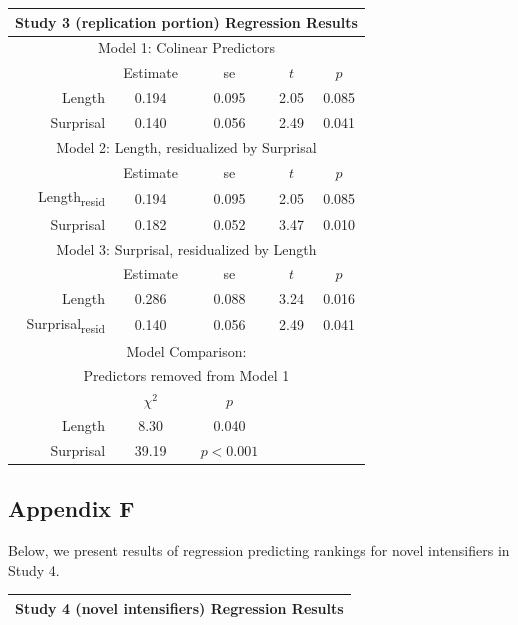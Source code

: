 \noindent
\footnotesize{
\begin{tabular}{r|cccc}
\hline
\hline
\multicolumn{5}{c}{\textbf{Study 3 (replication portion) Regression Results}} \\
\hline
\hline
\multicolumn{5}{c}{Model 1: Colinear Predictors} \\
& Estimate & se & $t$ & $p$ \\
\hline
Length & 0.194 & 0.095 & 2.05 & 0.085 \\
Surprisal & 0.140 & 0.056 & 2.49 & 0.041 \\
\hline
\hline
\multicolumn{5}{c}{Model 2: Length, residualized by Surprisal} \\
& Estimate & se & $t$ & $p$ \\
\hline
Length\textsubscript{resid} & 0.194 & 0.095 & 2.05 & 0.085 \\
Surprisal & 0.182 & 0.052 & 3.47 & 0.010 \\
\hline
\hline
\multicolumn{5}{c}{Model 3: Surprisal, residualized by Length} \\
& Estimate & se & $t$ & $p$ \\
\hline
Length & 0.286 & 0.088 & 3.24 & 0.016 \\
Surprisal\textsubscript{resid} & 0.140 & 0.056 & 2.49 & 0.041 \\
\hline
\hline
\multicolumn{5}{c}{Model Comparison:} \\
\multicolumn{5}{c}{Predictors removed from Model 1} \\
& $\chi^2$ & $p$ \\
\hline
Length & 8.30 & 0.040 \\
Surprisal & 39.19 & $p<0.001$ \\
\hline
\hline
\end{tabular}
}



\subsection{Appendix F}

Below, we present results of regression predicting rankings for novel intensifiers in Study 4.

\vspace{4mm}

\noindent
\footnotesize{
\begin{tabular}{r|cccc}
\hline
\hline
\multicolumn{5}{c}{\textbf{Study 4 (novel intensifiers) Regression Results}} \\
\hline
\hline
\end{tabular}
}

